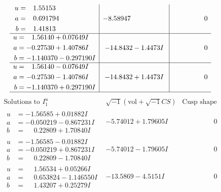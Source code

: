 \documentclass[1p]{elsarticle_modified}
\theoremstyle{definition}
\newcommand{\I}{\sqrt{-1}}
\begin{document}
$$\begin{array}{c|c|c}
\begin{aligned}
u &= \phantom{-}1.55153\phantom{ +0.000000I} \\
a &= \phantom{-}0.691794\phantom{ +0.000000I} \\
b &= \phantom{-}1.41813\phantom{ +0.000000I}\end{aligned}
 & -8.58947\phantom{ +0.000000I} & \phantom{-0.000000 } 0 \\ \hline\begin{aligned}
u &= \phantom{-}1.56140 + 0.07649 I \\
a &= -0.27530 + 1.40786 I \\
b &= -1.140370 - 0.297190 I\end{aligned}
 & -14.8432 - 1.4473 I & \phantom{-0.000000 } 0 \\ \hline\begin{aligned}
u &= \phantom{-}1.56140 - 0.07649 I \\
a &= -0.27530 - 1.40786 I \\
b &= -1.140370 + 0.297190 I\end{aligned}
 & -14.8432 + 1.4473 I & \phantom{-0.000000 } 0\\
 \hline 
 \end{array}$$\newpage$$\begin{array}{c|c|c}  
\text{Solutions to }I^u_{1}& \I (\text{vol} + \sqrt{-1}CS) & \text{Cusp shape}\\
 \hline 
\begin{aligned}
u &= -1.56585 + 0.01882 I \\
a &= -0.050219 - 0.867231 I \\
b &= \phantom{-}0.22809 + 1.70840 I\end{aligned}
 & -5.74012 + 1.79605 I & \phantom{-0.000000 } 0 \\ \hline\begin{aligned}
u &= -1.56585 - 0.01882 I \\
a &= -0.050219 + 0.867231 I \\
b &= \phantom{-}0.22809 - 1.70840 I\end{aligned}
 & -5.74012 - 1.79605 I & \phantom{-0.000000 } 0 \\ \hline\begin{aligned}
u &= \phantom{-}1.56534 + 0.05266 I \\
a &= \phantom{-}0.653824 - 1.146550 I \\
b &= \phantom{-}1.43207 + 0.25279 I\end{aligned}
 & -13.5869 - 4.5151 I & \phantom{-0.000000 } 0 \\ \hline\begin{aligned}

\end{aligned}
\end{array}$$
\end{document}
